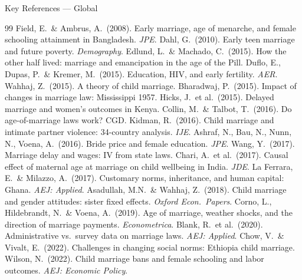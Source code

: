 \documentclass[aspectratio=169,10pt]{beamer}
\begin{document}
\begin{frame}[allowframebreaks]{Key References --- Global}
    \small
    \begin{thebibliography}{99}
         Field, E.\ \& Ambrus, A.\ (2008). Early marriage, age of menarche, and female schooling attainment in Bangladesh. \textit{JPE}.
         Dahl, G.\ (2010). Early teen marriage and future poverty. \textit{Demography}.
         Edlund, L.\ \& Machado, C.\ (2015). How the other half lived: marriage and emancipation in the age of the Pill.
         Duflo, E., Dupas, P.\ \& Kremer, M.\ (2015). Education, HIV, and early fertility. \textit{AER}.
         Wahhaj, Z.\ (2015). A theory of child marriage.
         Bharadwaj, P.\ (2015). Impact of changes in marriage law: Mississippi 1957.
         Hicks, J.\ et al.\ (2015). Delayed marriage and women's outcomes in Kenya.
         Collin, M.\ \& Talbot, T.\ (2016). Do age-of-marriage laws work? CGD.
         Kidman, R.\ (2016). Child marriage and intimate partner violence: 34-country analysis. \textit{IJE}.
         Ashraf, N., Bau, N., Nunn, N., Voena, A.\ (2016). Bride price and female education. \textit{JPE}.
         Wang, Y.\ (2017). Marriage delay and wages: IV from state laws.
         Chari, A.\ et al.\ (2017). Causal effect of maternal age at marriage on child wellbeing in India. \textit{JDE}.
         La Ferrara, E.\ \& Milazzo, A.\ (2017). Customary norms, inheritance, and human capital: Ghana. \textit{AEJ: Applied}.
         Asadullah, M.N.\ \& Wahhaj, Z.\ (2018). Child marriage and gender attitudes: sister fixed effects. \textit{Oxford Econ.\ Papers}.
         Corno, L., Hildebrandt, N.\ \& Voena, A.\ (2019). Age of marriage, weather shocks, and the direction of marriage payments. \textit{Econometrica}.
         Blank, R.\ et al.\ (2020). Administrative vs.\ survey data on marriage laws. \textit{AEJ: Applied}.
         Chow, V.\ \& Vivalt, E.\ (2022). Challenges in changing social norms: Ethiopia child marriage.
         Wilson, N.\ (2022). Child marriage bans and female schooling and labor outcomes. \textit{AEJ: Economic Policy}.
    \end{thebibliography}
\end{frame}
\end{document}
